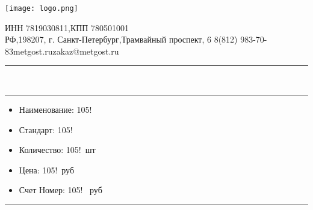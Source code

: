 \documentclass[10pt,a6paper,landscape]{book}
\begin{document}
\texttt{[image: logo.png]}
\begin{minipage}[c][20ex][t]{26em}
    ИНН 7819030811,КПП 780501001\\
    РФ,198207, г. Санкт-Петербург,Трамвайный проспект, 6
    8(812) 983-70-83\hfill metgost.ru\hfill zakaz@metgost.ru
    \par\noindent\rule{\textwidth}{0.5pt}\\
\end{minipage}
\par\noindent\rule{\textwidth}{0.5pt}

\begin{itemize}

    \item Наименование:  105!
    \item Стандарт:  105!
    \item Количество:  105!\ шт 
    \item Цена:  105!\ руб
    \item Счет Номер: 105! \ руб
\end{itemize}
\par\noindent\rule{\textwidth}{0.5pt}\\
\end{document}
